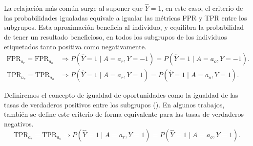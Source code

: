 \documentclass[oneside,openright,titlepage,numbers=noenddot,openany,headinclude,footinclude=true,
cleardoublepage=empty,abstractoff,BCOR=5mm,paper=a4,fontsize=12pt,main=spanish]{scrreprt}
\begin{document}
La relajación más común surge al suponer que $\hat{Y}=1$, en este caso, el criterio de las probabilidades igualadas equivale a igualar las métricas FPR y TPR entre los subgrupos. Esta aproximación beneficia al individuo, y equilibra la probabilidad de tener un resultado beneficioso, en todos los subgrupos de los individuos etiquetados tanto positiva como negativamente.
\begin{equation*}
\begin{split}
\text{FPR}_{a_r}=\text{FPR}_{a_o} &\Rightarrow P(\hat{Y}=1 \mid A=a_r,Y=-1)=P(\hat{Y}=1 \mid A=a_o, Y=-1).\\
\text{TPR}_{a_r}=\text{TPR}_{a_o} &\Rightarrow P(\hat{Y}=1 \mid A=a_r, Y=1)=P(\hat{Y}=1 \mid A=a_o, Y=1).
\end{split}
\end{equation*}

Definiremos el concepto de igualdad de oportunidades como la igualdad de las tasas de verdaderos positivos entre los subgrupos (\cite{eodd2016}). En algunos trabajos, también se define este criterio de forma equivalente para las tasas de verdaderos negativos.
\begin{equation*}
\text{TPR}_{a_r}=\text{TPR}_{a_o} \Rightarrow P(\hat{Y}= 1 \mid A=a_r, Y=1)=P(\hat{Y}= 1 \mid A=a_o, Y=1).
\end{equation*}\
\end{document}
